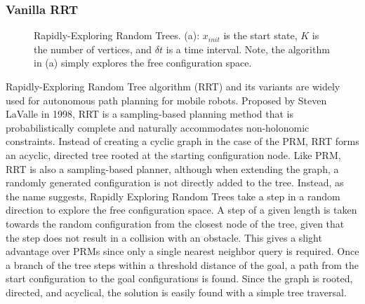 \documentclass[11pt]{article}
\begin{document}
        \subsubsection{Vanilla RRT}
        \begin{figure}[ht]
            \quad
            \caption{Rapidly-Exploring Random Trees. (a): $x_{init}$ is the start state, $K$ is the number of vertices, and $\delta t$ is a time interval. Note, the algorithm in (a) simply explores the free configuration space.}
            \label{fig:rrt}
        \end{figure}
            \par Rapidly-Exploring Random Tree algorithm (RRT) and its variants are widely used for autonomous path planning for mobile robots. Proposed by Steven LaValle in 1998, RRT is a sampling-based planning method that is probabilistically complete and naturally accommodates non-holonomic constraints. Instead of creating a cyclic graph in the case of the PRM, RRT forms an acyclic, directed tree rooted at the starting configuration node. Like PRM, RRT is also a sampling-based planner, although when extending the graph, a randomly generated configuration is not directly added to the tree. Instead, as the name suggests, Rapidly Exploring Random Trees take a step in a random direction to explore the free configuration space. A step of a given length is taken towards the random configuration from the closest node of the tree, given that the step does not result in a collision with an obstacle. This gives a slight advantage over PRMs since only a single nearest neighbor query is required. Once a branch of the tree steps within a threshold distance of the goal, a path from the start configuration to the goal configurations is found. Since the graph is rooted, directed, and acyclical, the solution is easily found with a simple tree traversal. 
\end{document}
